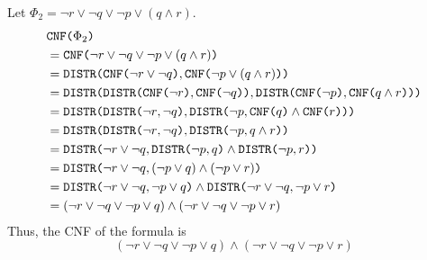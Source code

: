 \documentclass{article}
\begin{document}
Let $\Phi_2 = \neg r \lor \neg q \lor \neg p \lor (q \land r)$.
\begin{align*}
& \texttt{CNF($\Phi_2$)} \\
&= \texttt{CNF($\neg r \lor \neg q \lor \neg p \lor (q \land r)$)} \\
&= \texttt{DISTR($\texttt{CNF($\neg r \lor \neg q$)},\texttt{CNF($\neg p \lor (q \land r)$)}$)} \\
&= \texttt{DISTR($\texttt{DISTR($\texttt{CNF($\neg r$)},\texttt{CNF($\neg q$)}$)},\texttt{DISTR($\texttt{CNF($\neg p$)},\texttt{CNF($q \land r$)}$)}$)} \\
&= \texttt{DISTR($\texttt{DISTR(${\neg r},{\neg q}$)},\texttt{DISTR(${\neg p},{\texttt{CNF($q$)} \land \texttt{CNF($r$)}}$)}$)} \\
&= \texttt{DISTR($\texttt{DISTR(${\neg r},{\neg q}$)},\texttt{DISTR(${\neg p},{q \land r}$)}$)} \\
&= \texttt{DISTR($\neg r \lor \neg q,\texttt{DISTR($\neg p,q$)}\land \texttt{DISTR($\neg p,r$)}$)} \\
&= \texttt{DISTR($\neg r \lor \neg q,({\neg p}\lor{q})\land ({\neg p}\lor{r})$)} \\
&= \texttt{DISTR($\neg r \lor \neg q,{\neg p}\lor{q}$)} \land \texttt{DISTR($\neg r \lor \neg q,{\neg p}\lor{r}$)} \\
&= (\neg r \lor \neg q \lor \neg p \lor q) \land (\neg r \lor \neg q \lor \neg p \lor r)
\end{align*}
Thus, the CNF of the formula is
$$(\neg r \lor \neg q \lor \neg p \lor q) \land (\neg r \lor \neg q \lor \neg p \lor r)$$
\end{document}
